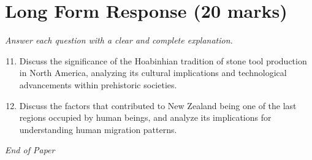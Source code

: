 \documentclass[12pt]{article}
\begin{document}
\section*{Long Form Response (20 marks)}
\textit{Answer each question with a clear and complete explanation.}
\begin{enumerate}[label=\arabic*.]
\setcounter{enumi}{10}
\item Discuss the significance of the Hoabinhian tradition of stone tool production in North
America, analyzing its cultural implications and technological advancements within
prehistoric societies.
\item Discuss the factors that contributed to New Zealand being one of the last regions occupied
by human beings, and analyze its implications for understanding human migration patterns.
\end{enumerate}

\vfill
\noindent\textit{End of Paper}
\end{document}
